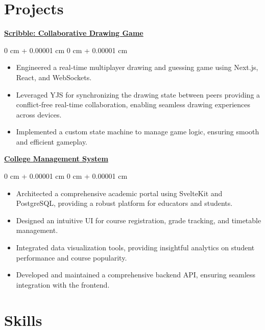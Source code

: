 \documentclass[10pt, letterpaper]{article}
\newenvironment{highlights}{
    \begin{itemize}[
        topsep=0.10 cm,
        parsep=0.10 cm,
        partopsep=0pt,
        itemsep=0pt,
        leftmargin=0 cm + 10pt
    ]
}{
    \end{itemize}
} %
\newenvironment{onecolentry}{
    \begin{adjustwidth}{
        0 cm + 0.00001 cm
    }{
        0 cm + 0.00001 cm
    }
}{
    \end{adjustwidth}
} %
\begin{document}
\section{Projects}
\textbf{\href{https://github.com/elweday1/scribble}{Scribble: Collaborative Drawing Game}}
\vspace{0.10 cm}
\begin{onecolentry}
    \begin{highlights}
        \item Engineered a real-time multiplayer drawing and guessing game using Next.js, React, and WebSockets.
        \item Leveraged YJS for synchronizing the drawing state between peers providing a conflict-free real-time collaboration, enabling seamless drawing experiences across devices.
        \item Implemented a custom state machine to manage game logic, ensuring smooth and efficient gameplay.

    \end{highlights}
\end{onecolentry}


\vspace{0.2 cm}

\textbf{\href{https://github.com/elweday1/CollegeSite}{College Management System}}

\vspace{0.10 cm}
\begin{onecolentry}
    \begin{highlights}
        \item Architected a comprehensive academic portal using SvelteKit and PostgreSQL, providing a robust platform for educators and students.
        \item Designed an intuitive UI for course registration, grade tracking, and timetable management.
        \item Integrated data visualization tools, providing insightful analytics on student performance and course popularity.
        \item Developed and maintained a comprehensive backend API, ensuring seamless integration with the frontend.
    \end{highlights}
\end{onecolentry}


\section{Skills}
\end{document}
